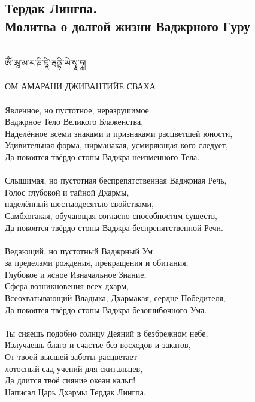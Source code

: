 \subsection{Тердак Лингпа. \\Молитва о долгой жизни Ваджрного Гуру}
\vspace{1cm}
\ti
\\
ཨོཾ་ཨཱ་མ་ར་ཎི་ཛཱི་ཝནྟི་ཡེ་སྭཱ་ཧཱ། \\
\ru \\ ОМ АМАРАНИ ДЖИВАНТИЙЕ СВАХА\\
\\
Явленное, но пустотное, неразрушимое \\ \indent Ваджрное Тело Великого Блаженства,\\
Наделённое всеми знаками и признаками расцветшей юности,\\
Удивительная форма, нирманакая, усмиряющая кого следует,\\
Да покоятся твёрдо стопы Ваджра неизменного Тела.\\
\\
Слышимая, но пустотная беспрепятственная Ваджрная Речь,\\
Голос глубокой и тайной Дхармы, \\ \indent наделённый шестьюдесятью свойствами,\\
Самбхогакая, обучающая согласно способностям существ,\\
Да покоятся твёрдо стопы Ваджра беспрепятственной Речи.\\
\\
Ведающий, но пустотный Ваджрный Ум \\ \indent за пределами рождения, прекращения и обитания,\\
Глубокое и ясное Изначальное Знание, \\ \indent Сфера возникновения всех дхарм,\\
Всеохватывающий Владыка, Дхармакая, сердце Победителя,\\
Да покоятся твёрдо стопы Ваджра безошибочного Ума.\\
\\
Ты сияешь подобно солнцу Деяний в безбрежном небе,\\
Излучаешь благо и счастье без восходов и закатов,\\
От твоей высшей заботы расцветает \\ \indent лотосный сад учений для скитальцев,\\
Да длится твоё сияние океан кальп!\\
\scriptsize
Написал Царь Дхармы Тердак Лингпа.
\normalsize
\newpage

